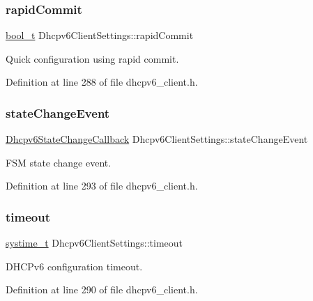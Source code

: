 \subsubsection{\texorpdfstring{rapid\+Commit}{rapidCommit}}
{\footnotesize\ttfamily \hyperlink{compiler__port_8h_a812d16e5494522586b3784e55d479912}{bool\+\_\+t} Dhcpv6\+Client\+Settings\+::rapid\+Commit}



Quick configuration using rapid commit. 



Definition at line 288 of file dhcpv6\+\_\+client.\+h.

\mbox{\label{structDhcpv6ClientSettings_aff55e81ba995a9eec72e25079de19280}} 
\subsubsection{\texorpdfstring{state\+Change\+Event}{stateChangeEvent}}
{\footnotesize\ttfamily \hyperlink{dhcpv6__client_8h_a40ca3757aa5a1b6e7e922eb0533f3b8b}{Dhcpv6\+State\+Change\+Callback} Dhcpv6\+Client\+Settings\+::state\+Change\+Event}



F\+SM state change event. 



Definition at line 293 of file dhcpv6\+\_\+client.\+h.

\mbox{\label{structDhcpv6ClientSettings_a440db6e60279995a67d8b3d522ca6f92}} 
\subsubsection{\texorpdfstring{timeout}{timeout}}
{\footnotesize\ttfamily \hyperlink{compiler__port_8h_ae3e32a98d431a02106616da3071832dd}{systime\+\_\+t} Dhcpv6\+Client\+Settings\+::timeout}



D\+H\+C\+Pv6 configuration timeout. 



Definition at line 290 of file dhcpv6\+\_\+client.\+h.

